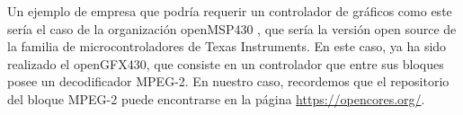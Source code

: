 Un ejemplo de empresa que podría requerir un controlador de gráficos como este sería el caso de la organización openMSP430 , que sería la versión open source de la familia de microcontroladores de Texas Instruments. En este caso, ya ha sido realizado el openGFX430, que consiste en un controlador que entre sus bloques posee un decodificador MPEG-2. En nuestro caso, recordemos que el repositorio del bloque MPEG-2 puede encontrarse en la página \url{https://opencores.org/}.


%








